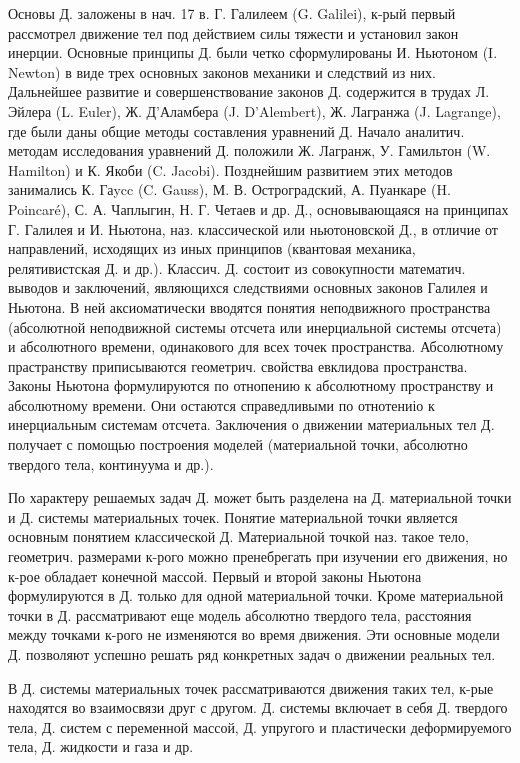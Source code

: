 \documentclass[10pt]{article}
\begin{document}
Основы Д. заложены в нач. 17 в. Г. Галилеем (G. Galilei), к-рый первый рассмотрел движение тел под действием силы тяжести и установил закон инерции. Основные принципы Д. были четко сформулированы И. Ньютоном (I. Newton) в виде трех основных законов механики и следствий из них. Дальнейшее развитие и совершенствование законов Д. содержится в трудах Л. Эйлера (L. Euler), Ж. Д'Аламбера (J. D'Alembert), Ж. Лагранжа (J. Lagrange), где были даны общие методы составления уравнений Д. Начало аналитич. методам исследования уравнений Д. положили Ж. Лагранж, У. Гамильтон (W. Hamilton) и К. Якоби (C. Jacobi). Позднейшим развитием этих методов занимались К. Гаycc (C. Gauss), М. В. Остроградский, А. Пуанкаре (H. Poincaré), С. А. Чаплыгин, Н. Г. Четаев и др. Д., основывающаяся на принципах Г. Галилея и И. Ньютона, наз. классической или ньютоновской Д., в отличие от направлений, исходящих из иных принципов (квантовая механика, релятивистская Д. и др.). Классич. Д. состоит из совокупности математич. выводов и заключений, являющихся следствиями основных законов Галилея и Ньютона. В ней аксиоматически вводятся понятия неподвижного пространства (абсолютной неподвижной системы отсчета или инерциальной системы отсчета) и абсолютного времени, одинакового для всех точек пространства. Абсолютному прастранству приписываются геометрич. свойства евклидова пространства. Законы Ньютона формулируются по отнопению к абсолютному пространству и абсолютному времени. Они остаются справедливыми по отнотениіо к инерциальным системам отсчета. Заключения о движении материальных тел Д. получает с помощью построения моделей (материальной точки, абсолютно твердого тела, континуума и др.).



По характеру решаемых задач Д. может быть разделена на Д. материальной точки и Д. системы материальных точек. Понятие материальной точки является основным понятием классической Д. Материальной точкой наз. такое тело, геометрич. размерами к-рого можно пренебрегать при изучении его движения, но к-рое обладает конечной массой. Первый и второй законы Ньютона формулируются в Д. только для одной материальной точки. Кроме материальной точки в Д. рассматривают еще модель абсолютно твердого тела, расстояния между точками к-рого не изменяются во время движения. Эти основные модели Д. позволяют успешно решать ряд конкретных задач о движении реальных тел.



В Д. системы материальных точек рассматриваются движения таких тел, к-рые находятся во взаимосвязи друг с другом. Д. системы включает в себя Д. твердого тела, Д. систем с переменной массой, Д. упругого и пластически деформируемого тела, Д. жидкости и газа и др.
\end{document}
